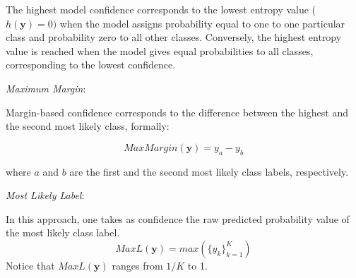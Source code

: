 The highest model confidence corresponds to the lowest entropy value ($h(\textbf{y})=0)$ when the model assigns probability equal to one to one particular class and probability zero to all other classes. Conversely, the highest entropy value is reached when the model gives equal probabilities to all classes, corresponding to the lowest confidence.%


\bigskip
\noindent
\textit{Maximum Margin}:


Margin-based confidence \cite{makingsynthesis} corresponds to the difference between the highest and the second most likely class, formally:

\begin{equation}
MaxMargin(\textbf{y}) = y_a - y_b
\end{equation}
\iffalse
\begin{equation}
u_i = P(\hat{y}_{1,i}|x_i)-P(\hat{y}_{2,i}|x_i)
\end{equation}
\fi

\noindent
where $a$ and $b$ are the first and the second most likely class labels, respectively. 

\bigskip
\noindent
\textit{Most Likely Label}:

In this approach, one takes as confidence the raw predicted probability value of the most likely class label. 
\begin{equation}
MaxL (\textbf{y}) = max ({ \{ y_k \}_{k=1}^K })
\end{equation}
\bigskip
Notice that $MaxL (\textbf{y})$ ranges from $1/K$ to 1.
\iffalse
\begin{equation}
u_i = -P(\hat{y}_{n,i}|x)
\end{equation}
\fi



